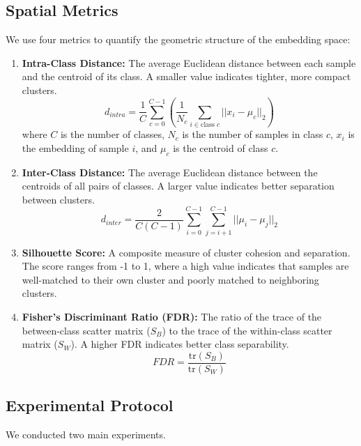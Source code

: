\documentclass[conference]{IEEEtran}
\begin{document}
\subsection{Spatial Metrics}
We use four metrics to quantify the geometric structure of the embedding space:

\begin{enumerate}
    \item \textbf{Intra-Class Distance:} The average Euclidean distance between each sample and the centroid of its class. A smaller value indicates tighter, more compact clusters.
    \begin{equation}
    d_{intra} = \frac{1}{C}\sum_{c=0}^{C-1}\left(\frac{1}{N_c}\sum_{i \in \text{class } c} ||x_i - \mu_c||_2\right)
    \end{equation}
    where $C$ is the number of classes, $N_c$ is the number of samples in class $c$, $x_i$ is the embedding of sample $i$, and $\mu_c$ is the centroid of class $c$.

    \item \textbf{Inter-Class Distance:} The average Euclidean distance between the centroids of all pairs of classes. A larger value indicates better separation between clusters.
    \begin{equation}
    d_{inter} = \frac{2}{C(C-1)}\sum_{i=0}^{C-1}\sum_{j=i+1}^{C-1} ||\mu_i - \mu_j||_2
    \end{equation}

    \item \textbf{Silhouette Score:} A composite measure of cluster cohesion and separation. The score ranges from -1 to 1, where a high value indicates that samples are well-matched to their own cluster and poorly matched to neighboring clusters.

    \item \textbf{Fisher's Discriminant Ratio (FDR):} The ratio of the trace of the between-class scatter matrix ($S_B$) to the trace of the within-class scatter matrix ($S_W$). A higher FDR indicates better class separability.
    \begin{equation}
    FDR = \frac{\text{tr}(S_B)}{\text{tr}(S_W)}
    \end{equation}
\end{enumerate}

\subsection{Experimental Protocol}
We conducted two main experiments.
\end{document}
